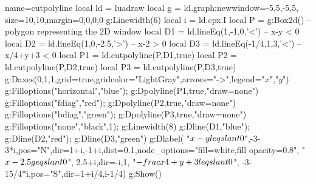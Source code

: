 \begin{luadraw}{name=cutpolyline}
local ld = luadraw
local g = ld.graph:new{window={-5,5,-5,5}, size={10,10},margin={0,0,0,0}}
g:Linewidth(6)
local i = ld.cpx.I
local P = g:Box2d() -- polygon representing the 2D window
local D1 = ld.lineEq(1,-1,0,'<')    -- x-y < 0
local D2 = ld.lineEq(1,0,-2.5,'>')  -- x-2 > 0
local D3 = ld.lineEq(-1/4,1,3,'<')  -- x/4+y+3 < 0
local P1 = ld.cutpolyline(P,D1,true)
local P2 = ld.cutpolyline(P,D2,true)
local P3 = ld.cutpolyline(P,D3,true)
g:Daxes({0,1,1},{grid=true,gridcolor="LightGray",arrows="->",legend={"$x$","$y$"}})
g:Filloptions("horizontal","blue"); g:Dpolyline(P1,true,"draw=none")
g:Filloptions("fdiag","red"); g:Dpolyline(P2,true,"draw=none")
g:Filloptions("bdiag","green"); g:Dpolyline(P3,true,"draw=none")
g:Filloptions("none","black",1); g:Linewidth(8)
g:Dline(D1,"blue"); g:Dline(D2,"red"); g:Dline(D3,"green")
g:Dlabel(
  "$x-y\\leqslant 0$",-3-3*i,{pos="N",dir={1+i,-1+i},dist=0.1,node_options="fill=white,fill opacity=0.8"},
  "$x-2.5\\geqslant0$", 2.5+i,{dir={-i,1}},
  "$-\\frac{x}{4}+y+3\\leqslant0$", -3-15/4*i,{pos="S",dir={1+i/4,i-1/4}})
g:Show()
\end{luadraw}
